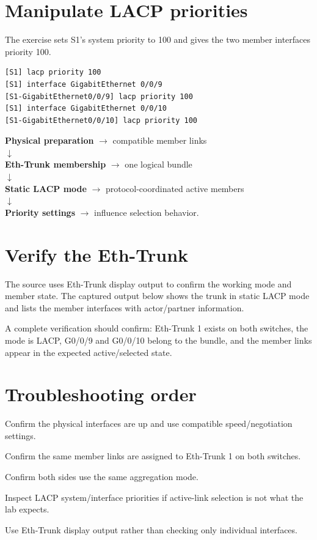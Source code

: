 \section{Manipulate LACP priorities}
The exercise sets S1's system priority to 100 and gives the two member interfaces priority 100.
\begin{lstlisting}[style=dcnterminal]
[S1] lacp priority 100
[S1] interface GigabitEthernet 0/0/9
[S1-GigabitEthernet0/0/9] lacp priority 100
[S1] interface GigabitEthernet 0/0/10
[S1-GigabitEthernet0/0/10] lacp priority 100
\end{lstlisting}

\begin{conceptmap}
\textbf{Physical preparation} $\rightarrow$ compatible member links\\
$\downarrow$\\
\textbf{Eth-Trunk membership} $\rightarrow$ one logical bundle\\
$\downarrow$\\
\textbf{Static LACP mode} $\rightarrow$ protocol-coordinated active members\\
$\downarrow$\\
\textbf{Priority settings} $\rightarrow$ influence selection behavior.
\end{conceptmap}

\section{Verify the Eth-Trunk}
The source uses Eth-Trunk display output to confirm the working mode and member state. The captured output below shows the trunk in static LACP mode and lists the member interfaces with actor/partner information.


\begin{verifybox}
A complete verification should confirm: Eth-Trunk 1 exists on both switches, the mode is LACP, G0/0/9 and G0/0/10 belong to the bundle, and the member links appear in the expected active/selected state.
\end{verifybox}

\section{Troubleshooting order}
\begin{netsteps}
\item Confirm the physical interfaces are up and use compatible speed/negotiation settings.
\item Confirm the same member links are assigned to Eth-Trunk 1 on both switches.
\item Confirm both sides use the same aggregation mode.
\item Inspect LACP system/interface priorities if active-link selection is not what the lab expects.
\item Use Eth-Trunk display output rather than checking only individual interfaces.
\end{netsteps}

